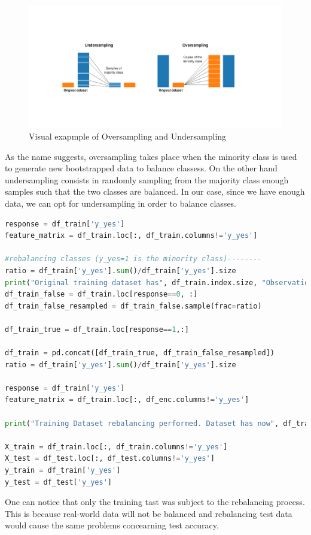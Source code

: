 \begin{figure}[H]
    \centering
    \includegraphics[scale=0.4]{pictures/undersampling-oversampling.png}

    \caption*{Visual exapmple of Oversampling and Undersampling}
\end{figure}
As the name suggests, oversampling takes place when the minority class is used to generate new bootstrapped data to balance classess. On the other hand undersampling consists in randomly sampling from the majority class enough samples such that the two classes are balanced. In our case, since we have enough data, we can opt for undersampling in order to balance classes.

\begin{lstlisting}[language=Python, caption= Data rebalancing]
response = df_train['y_yes']
feature_matrix = df_train.loc[:, df_train.columns!='y_yes']

#rebalancing classes (y_yes=1 is the minority class)--------
ratio = df_train['y_yes'].sum()/df_train['y_yes'].size
print("Original training dataset has", df_train.index.size, "Observations. \n", "Among them", response.sum(), "are positive and", response.size-response.sum(), "are negative \n Performing dataset rebalancing by undersampling... \n\n" )
df_train_false = df_train.loc[response==0, :]
df_train_false_resampled = df_train_false.sample(frac=ratio)

df_train_true = df_train.loc[response==1,:]

df_train = pd.concat([df_train_true, df_train_false_resampled])
ratio = df_train['y_yes'].sum()/df_train['y_yes'].size

response = df_train['y_yes']
feature_matrix = df_train.loc[:, df_enc.columns!='y_yes']

print("Training Dataset rebalancing performed. Dataset has now", df_train.index.size, "Observations. \n", "Among them", response.sum(), "are positive and", response.size-response.sum(), "are negative \n\n" )

X_train = df_train.loc[:, df_train.columns!='y_yes']
X_test = df_test.loc[:, df_test.columns!='y_yes']
y_train = df_train['y_yes']
y_test = df_test['y_yes']

\end{lstlisting}
One can notice that only the training tast was subject to the rebalancing process. This is because real-world data will not be balanced and rebalancing test data would cause the same problems concearning test accuracy.

